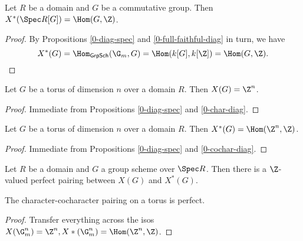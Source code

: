 \begin{proposition}
  \label{0-cochar-diag}
  \leanok

  Let $R$ be a domain and $G$ be a commutative group.
  Then $X^*(\Spec R[G]) = \Hom(G, \Z)$.
\end{proposition}
\begin{proof}
  \leanok

  By Propositions \ref{0-diag-spec} and \ref{0-full-faithful-diag} in turn, we have
  \[
    X^*(G) = \Hom_{\mathsf{GrpSch}}(\G_m, G) = \Hom(k[G], k[\Z]) = \Hom(G, \Z).
  \]
\end{proof}


\begin{proposition}
  \label{0-char-torus}
  \leanok

  Let $G$ be a torus of dimension $n$ over a domain $R$.
  Then $X(G) = \Z^n$.
\end{proposition}
\begin{proof}
  \leanok

  Immediate from Propositions \ref{0-diag-spec} and \ref{0-char-diag}.
\end{proof}


\begin{proposition}
  \label{0-cochar-torus}
  \leanok

  Let $G$ be a torus of dimension $n$ over a domain $R$.
  Then $X^*(G) = \Hom(\Z^n, \Z)$.
\end{proposition}
\begin{proof}
  \leanok

  Immediate from Propositions \ref{0-diag-spec} and \ref{0-cochar-diag}.
\end{proof}


\begin{definition}
  \label{0-char-cochar-pairing}
  \leanok

  Let $R$ be a domain and $G$ a group scheme over $\Spec R$.
  Then there is a $\Z$-valued perfect pairing between $X(G)$ and $X^*(G)$.
\end{definition}


\begin{proposition}
  \label{0-char-cochar-pairing-perfect}
  \leanok

  The character-cocharacter pairing on a torus is perfect.
\end{proposition}
\begin{proof}
  \uses{}
  \leanok

  Transfer everything across the isos $X(\G_m^n) = \Z^n, X*(\G_m^n) = \Hom(\Z^n, \Z)$.
\end{proof}
